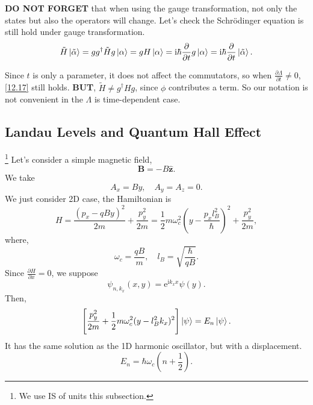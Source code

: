\documentclass{article}
\theoremstyle{1}
\newcommand{\pa}{\partial}
\newcommand{\ii}{\mathrm{i}}
\begin{document}
\textbf{DO NOT FORGET} that when using the gauge transformation, not only the states but also the operators will change. Let's check the Schrödinger equation is still hold under gauge transformation.
\begin{equation}
 \tilde{H} \ket{\tilde{\alpha}}=g g^\dagger \tilde{H}g\ket{\alpha}=g H\ket{\alpha}=\ii\hbar  \frac{\pa}{\pa t}g \ket{\alpha}=\ii\hbar \frac{\pa }{\pa t}\ket{\tilde{\alpha}}.
\end{equation}

Since $t$ is only a parameter, it does not affect the commutators, so when $\frac{\pa\Lambda}{\pa t}\not=0$, \eqref{12.17} still holds. \textbf{BUT}, $\tilde{H}\not=g^\dagger Hg$, since  $\phi$ contributes a term. So our notation is not convenient in the $\Lambda$ is time-dependent case.

\subsection{Landau Levels and Quantum Hall Effect}
\footnote{We use IS of units this subsection.}
Let's consider a simple magnetic field,
\begin{equation}
    \mathbf{B}=-B\hat{\mathbf{z}}.
\end{equation}
We take 
\begin{equation}
    A_x=By,\quad A_y=A_z=0.
\end{equation}
We just consider 2D case, the Hamiltonian is 
\begin{equation}
    H=\frac{\left(p_x-qBy\right)^2}{2m}+\frac{p_y^2}{2m}=\frac{1}{2}m\omega_c^2\left(y-\frac{p_xl_B^2}{\hbar}\right)^2+\frac{p_y^2}{2m},
\end{equation}
where,
\begin{equation}
    \omega_c=\frac{qB}{m},\quad l_B=\sqrt{\frac{\hbar}{qB}}.
\end{equation}
Since $\frac{\pa H}{\pa x}=0$, we suppose 
\begin{equation}
    \psi_{n,k_x}(x,y)=\mathrm{e}^{\mathrm{i}k_x x}\psi(y).
\end{equation}
Then, 
\begin{equation}
    \left[\frac{p_y^2}{2m}+\frac{1}{2}m\omega_c^2(y-l_B^2k_x)^2\right]\ket{\psi}=E_n\ket{\psi}.
\end{equation}
It has the same solution as the 1D harmonic oscillator, but with a displacement. 
\begin{equation}
    E_n=\hbar\omega_c\left(n+\frac{1}{2}\right).
\end{equation}
\end{document}
